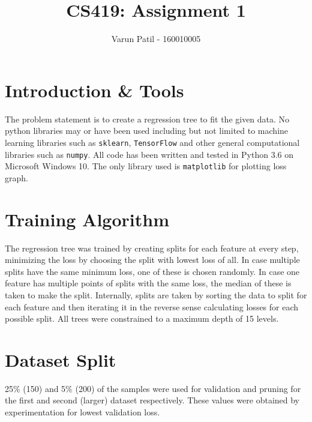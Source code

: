 \documentclass{article}
\title{CS419: Assignment 1}
\author{Varun Patil - 160010005}
\begin{document}
	\maketitle
	
\section{Introduction \& Tools}
The problem statement is to create a regression tree to fit the given data. No python libraries may or have been used including but not limited to machine learning libraries such as \texttt{sklearn}, \texttt{TensorFlow} and other general computational libraries such as \texttt{numpy}. All code has been written and tested in Python 3.6 on Microsoft Windows 10. The only library used is \texttt{matplotlib} for plotting loss graph.

\section{Training Algorithm}
The regression tree was trained by creating splits for each feature at every step, minimizing the loss by choosing the split with lowest loss of all. In case multiple splits have the same minimum loss, one of these is chosen randomly. In case one feature has multiple points of splits with the same loss, the median of these is taken to make the split. Internally, splits are taken by sorting the data to split for each feature and then iterating it in the reverse sense calculating losses for each possible split. All trees were constrained to a maximum depth of 15 levels.

\section{Dataset Split}
25\% (150) and 5\% (200) of the samples were used for validation and pruning for the first and second (larger) dataset respectively. These values were obtained by experimentation for lowest validation loss.
\end{document}
